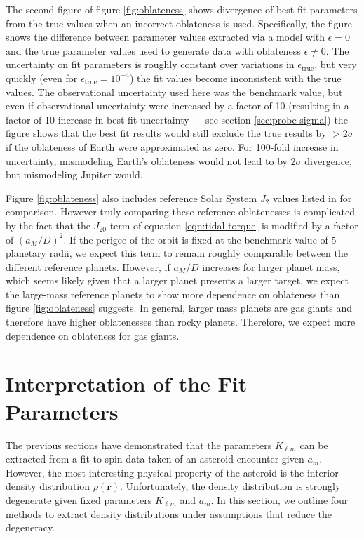 \documentclass{aastex631}
\begin{document}
The second figure of figure \ref{fig:oblateness} shows divergence of best-fit parameters from the true values when an incorrect oblateness is used. Specifically, the figure shows the difference between parameter values extracted via a model with $\epsilon=0$ and the true parameter values used to generate data with oblateness $\epsilon \neq 0$. The uncertainty on fit parameters is roughly constant over variations in $\epsilon_\textrm{true}$, but very quickly (even for $\epsilon_\textrm{true} = 10^{-4}$) the fit values become inconsistent with the true values. The observational uncertainty used here was the benchmark value, but even if observational uncertainty were increased by a factor of 10 (resulting in a factor of 10 increase in best-fit uncertainty --- see section \ref{sec:probe-sigma}) the figure shows that the best fit results would still exclude the true results by $>2\sigma$ if the oblateness of Earth were approximated as zero. For 100-fold increase in uncertainty, mismodeling Earth's oblateness would not lead to by $2\sigma$  divergence, but mismodeling Jupiter would.

Figure \ref{fig:oblateness} also includes reference Solar System $J_{2}$ values listed in \cite{pater_lissauer_2015} for comparison. However truly comparing these reference oblatenesses is complicated by the fact that the $J_{20}$ term of equation \ref{eqn:tidal-torque} is modified by a factor of $(a_M/D)^2$. If the perigee of the orbit is fixed at the benchmark value of 5 planetary radii, we expect this term to remain roughly comparable between the different reference planets. However, if $a_M / D$ increases for larger planet mass, which seems likely given that a larger planet presents a larger target, we expect the large-mass reference planets to show more dependence on oblateness than figure \ref{fig:oblateness} suggests. In general, larger mass planets are gas giants and therefore have higher oblatenesses than rocky planets. Therefore, we expect more dependence on oblateness for gas giants.



\section{Interpretation of the Fit Parameters}
The previous sections have demonstrated that the parameters $K_{\ell m}$ can be extracted from a fit to spin data taken of an asteroid encounter given $a_m$. However, the most interesting physical property of the asteroid is the interior density distribution $\rho(\bm r)$. Unfortunately, the density distribution is strongly degenerate given fixed parameters $K_{\ell m}$ and $a_m$. In this section, we outline four methods to extract density distributions under assumptions that reduce the degeneracy.
\end{document}
